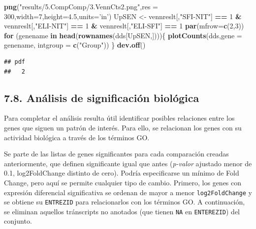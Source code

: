 \documentclass[
]{article}
\newenvironment{Shaded}{\begin{snugshade}}{\end{snugshade}}
\newcommand{\ControlFlowTok}[1]{\textcolor[rgb]{0.13,0.29,0.53}{\textbf{#1}}}
\newcommand{\DataTypeTok}[1]{\textcolor[rgb]{0.13,0.29,0.53}{#1}}
\newcommand{\DecValTok}[1]{\textcolor[rgb]{0.00,0.00,0.81}{#1}}
\newcommand{\FloatTok}[1]{\textcolor[rgb]{0.00,0.00,0.81}{#1}}
\newcommand{\KeywordTok}[1]{\textcolor[rgb]{0.13,0.29,0.53}{\textbf{#1}}}
\newcommand{\NormalTok}[1]{#1}
\newcommand{\OperatorTok}[1]{\textcolor[rgb]{0.81,0.36,0.00}{\textbf{#1}}}
\newcommand{\StringTok}[1]{\textcolor[rgb]{0.31,0.60,0.02}{#1}}
\begin{document}
\begin{Shaded}
\begin{Highlighting}[]
\KeywordTok{png}\NormalTok{(}\StringTok{"results/5.CompComp/3.VennCts2.png"}\NormalTok{,}\DataTypeTok{res =} \DecValTok{300}\NormalTok{,}\DataTypeTok{width=}\DecValTok{7}\NormalTok{,}\DataTypeTok{height=}\FloatTok{4.5}\NormalTok{,}\DataTypeTok{units=}\StringTok{'in'}\NormalTok{)}
\NormalTok{UpSEN <-}\StringTok{ }\NormalTok{vennreslt[,}\StringTok{"SFI-NIT"}\NormalTok{] }\OperatorTok{==}\StringTok{ }\DecValTok{1} \OperatorTok{&}\StringTok{ }\NormalTok{vennreslt[,}\StringTok{"ELI-NIT"}\NormalTok{] }\OperatorTok{==}\StringTok{ }\DecValTok{1} \OperatorTok{&}
\StringTok{  }\NormalTok{vennreslt[,}\StringTok{"ELI-SFI"}\NormalTok{] }\OperatorTok{==}\StringTok{ }\DecValTok{1}  
\KeywordTok{par}\NormalTok{(}\DataTypeTok{mfrow=}\KeywordTok{c}\NormalTok{(}\DecValTok{2}\NormalTok{,}\DecValTok{3}\NormalTok{))}
\ControlFlowTok{for}\NormalTok{ (genename }\ControlFlowTok{in} \KeywordTok{head}\NormalTok{(}\KeywordTok{rownames}\NormalTok{(dds[UpSEN,])))\{}
  \KeywordTok{plotCounts}\NormalTok{(dds,}\DataTypeTok{gene =}\NormalTok{ genename, }\DataTypeTok{intgroup =} \KeywordTok{c}\NormalTok{(}\StringTok{"Group"}\NormalTok{))}
\NormalTok{\}}
\KeywordTok{dev.off}\NormalTok{()}
\end{Highlighting}
\end{Shaded}

\begin{verbatim}
## pdf 
##   2
\end{verbatim}

\hypertarget{anuxe1lisis-de-significaciuxf3n-bioluxf3gica-2}{%
\subsection{7.8. Análisis de significación
biológica}\label{anuxe1lisis-de-significaciuxf3n-bioluxf3gica-2}}

Para completar el análisis resulta útil identificar posibles relaciones
entre los genes que siguen un patrón de interés. Para ello, se
relacionan los genes con su actividad biológica a través de los términos
GO.

Se parte de las listas de genes significantes para cada comparación
creadas anteriormente, que definen significante igual que antes
(\emph{p-valor} ajustado menor de 0.1, log2FoldChange distinto de cero).
Podría especificarse un mínimo de Fold Change, pero aquí se permite
cualquier tipo de cambio. Primero, los genes con expresión diferencial
significativa se ordenan de mayor a menor \texttt{log2FoldChange} y se
obtiene su \texttt{ENTREZID} para relacionarlos con los términos GO. A
continuación, se eliminan aquellos tránscripts no anotados (que tienen
\texttt{NA} en \texttt{ENTEREZID}) del conjunto.
\end{document}
